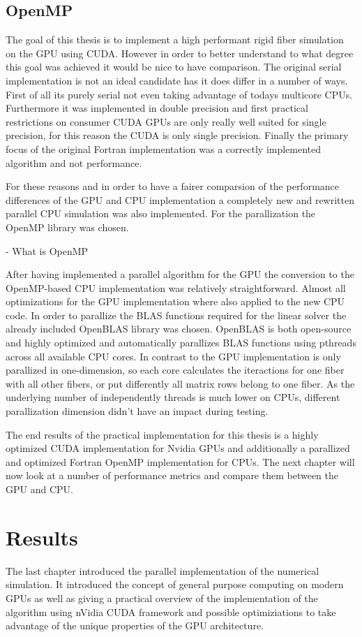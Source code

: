 \documentclass[a4paper,11pt]{kth-mag}
\begin{document}
\section{OpenMP}

The goal of this thesis is to implement a high performant rigid fiber simulation on the GPU using CUDA. However in order to better understand to what degree this goal was achieved it would be nice to have comparison. The original serial implementation is not an ideal candidate has it does differ in a number of ways. First of all its purely serial not even taking advantage of todays multicore CPUs. Furthermore it was implemented in double precision and first practical restrictions on consumer CUDA GPUs are only really well suited for single precision, for this reason the CUDA is only single precision. Finally the primary focus of the original Fortran implementation was a correctly implemented algorithm and not performance.

For these reasons and in order to have a fairer comparsion of the performance differences of the GPU and CPU implementation a completely new and rewritten parallel CPU simulation was also implemented. For the parallization the OpenMP library was chosen.

- What is OpenMP

After having implemented a parallel algorithm for the GPU the conversion to the OpenMP-based CPU implementation was relatively straightforward. Almost all optimizations for the GPU implementation where also applied to the new CPU code. In order to parallize the BLAS functions required for the linear solver the already included OpenBLAS library was chosen. OpenBLAS is both open-source and highly optimized and automatically parallizes BLAS functions using pthreads across all available CPU cores. In contrast to the GPU implementation is only parallized in one-dimension, so each core calculates the iteractions for one fiber with all other fibers, or put differently all matrix rows belong to one fiber. As the underlying number of independently threads is much lower on CPUs, different parallization dimension didn't have an impact during testing.

The end results of the practical implementation for this thesis is a highly optimized CUDA implementation for Nvidia GPUs and additionally a parallized and optimized Fortran OpenMP implementation for CPUs. The next chapter will now look at a number of performance metrics and compare them between the GPU and CPU.

\chapter{Results}
The last chapter introduced the parallel implementation of the numerical simulation. It introduced the concept of general purpose computing on modern GPUs as well as giving a practical overview of the implementation of the algorithm using nVidia CUDA framework and possible optimiziations to take advantage of the unique properties of the GPU architecture.
\end{document}
